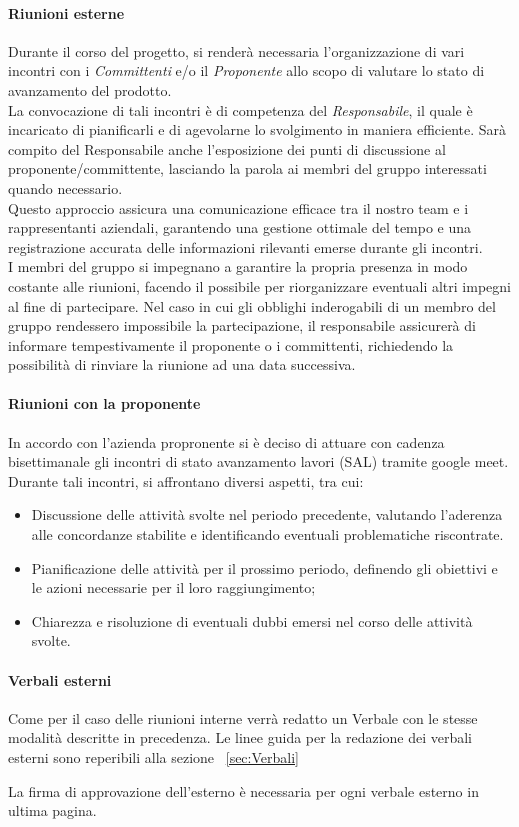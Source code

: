\paragraph{Riunioni esterne}
Durante il corso del progetto, si renderà necessaria l'organizzazione di vari incontri con i \textit{Committenti} e/o il \textit{Proponente} allo scopo di valutare lo stato di avanzamento del prodotto.\\
La convocazione di tali incontri è di competenza del \textit{Responsabile}, il quale è incaricato di pianificarli e di agevolarne lo svolgimento in maniera efficiente. Sarà compito del Responsabile anche l'esposizione dei punti di discussione al proponente/committente, lasciando la parola ai membri del gruppo interessati quando necessario.
\\
Questo approccio assicura una comunicazione efficace tra il nostro team e i rappresentanti aziendali, garantendo una gestione ottimale del tempo e una registrazione accurata delle informazioni rilevanti emerse durante gli incontri.\\
I membri del gruppo si impegnano a garantire la propria presenza in modo costante alle riunioni, facendo il possibile per riorganizzare eventuali altri impegni al fine di partecipare. Nel caso in cui gli obblighi inderogabili di un membro del gruppo rendessero impossibile la partecipazione, il responsabile assicurerà di informare tempestivamente il proponente o i committenti, richiedendo la possibilità di rinviare la riunione ad una data successiva.

\paragraph*{Riunioni con la proponente}
In accordo con l'azienda propronente si è deciso di attuare con cadenza bisettimanale gli incontri di stato avanzamento lavori (SAL) tramite google meet.\\
Durante tali incontri, si affrontano diversi aspetti, tra cui:
\begin{itemize}
    \item Discussione delle attività svolte nel periodo precedente, valutando l'aderenza alle concordanze stabilite e identificando eventuali problematiche riscontrate.
    \item Pianificazione delle attività per il prossimo periodo, definendo gli obiettivi e le azioni necessarie per il loro raggiungimento;
    \item Chiarezza e risoluzione di eventuali dubbi emersi nel corso delle attività svolte.
\end{itemize}

\paragraph*{Verbali esterni}
Come per il caso delle riunioni interne verrà redatto un Verbale con le stesse
modalità descritte in precedenza.
Le linee guida per la redazione dei verbali esterni sono reperibili alla sezione  ~\ref{sec:Verbali}

\vspace{0.1cm}

La firma di approvazione dell'esterno è necessaria per ogni verbale esterno in ultima pagina.
